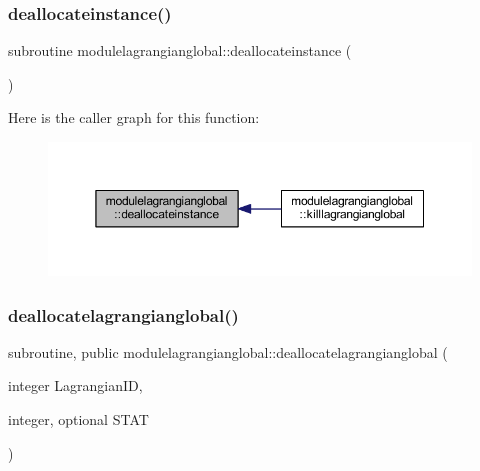 \subsubsection{\texorpdfstring{deallocateinstance()}{deallocateinstance()}}
{\footnotesize\ttfamily subroutine modulelagrangianglobal\+::deallocateinstance (\begin{DoxyParamCaption}{ }\end{DoxyParamCaption})\hspace{0.3cm}{\ttfamily [private]}}

Here is the caller graph for this function\+:\nopagebreak
\begin{figure}[H]
\begin{center}
\leavevmode
\includegraphics[width=350pt]{namespacemodulelagrangianglobal_a8fa9aff34dfeede08953dd200b17e64b_icgraph}
\end{center}
\end{figure}
\mbox{\label{namespacemodulelagrangianglobal_ad5b47824d7c52644996eed764c9ee9ae}} 
\subsubsection{\texorpdfstring{deallocatelagrangianglobal()}{deallocatelagrangianglobal()}}
{\footnotesize\ttfamily subroutine, public modulelagrangianglobal\+::deallocatelagrangianglobal (\begin{DoxyParamCaption}\item[{integer}]{Lagrangian\+ID,  }\item[{integer, optional}]{S\+T\+AT }\end{DoxyParamCaption})}

